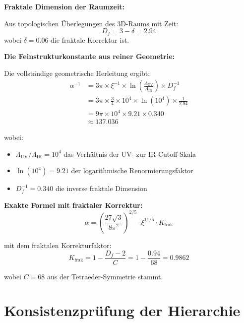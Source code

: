 \documentclass[12pt,a4paper]{article}
\newcommand{\xipar}{\xi}
\begin{document}
	\begin{keyresult}
		\textbf{Fraktale Dimension der Raumzeit:}
		
		Aus topologischen Überlegungen des 3D-Raums mit Zeit:
		\begin{equation}
			D_f = 3 - \delta = 2.94
		\end{equation}
		wobei $\delta = 0.06$ die fraktale Korrektur ist.
		
		\textbf{Die Feinstrukturkonstante aus reiner Geometrie:}
		
		Die vollständige geometrische Herleitung ergibt:
		\begin{align}
			\alpha^{-1} &= 3\pi \times \xipar^{-1} \times \ln\left(\frac{\Lambda_{\text{UV}}}{\Lambda_{\text{IR}}}\right) \times D_f^{-1} \\
			&= 3\pi \times \frac{3}{4} \times 10^{4} \times \ln(10^{4}) \times \frac{1}{2.94} \\
			&= 9\pi \times 10^{4} \times 9.21 \times 0.340 \\
			&\approx 137.036
		\end{align}
		
		wobei:
		\begin{itemize}
			\item $\Lambda_{\text{UV}}/\Lambda_{\text{IR}} = 10^4$ das Verhältnis der UV- zur IR-Cutoff-Skala
			\item $\ln(10^4) = 9.21$ der logarithmische Renormierungsfaktor
			\item $D_f^{-1} = 0.340$ die inverse fraktale Dimension
		\end{itemize}
		
		\textbf{Exakte Formel mit fraktaler Korrektur:}
		\begin{equation}
			\boxed{\alpha = \left(\frac{27\sqrt{3}}{8\pi^2}\right)^{2/5} \cdot \xipar^{11/5} \cdot K_{\text{frak}}}
		\end{equation}
		
		mit dem fraktalen Korrekturfaktor:
		\begin{equation}
			K_{\text{frak}} = 1 - \frac{D_f - 2}{C} = 1 - \frac{0.94}{68} = 0.9862
		\end{equation}
		
		wobei $C = 68$ aus der Tetraeder-Symmetrie stammt.
	\end{keyresult}
	
	\section{Konsistenzprüfung der Hierarchie}
	
\end{document}
